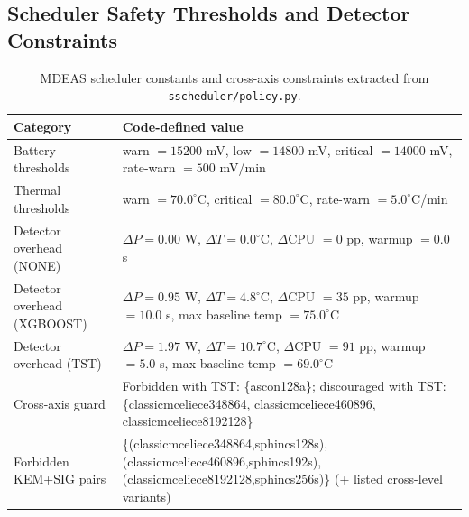 \subsection{Scheduler Safety Thresholds and Detector Constraints}
\begin{table}[t]
\centering
\caption{MDEAS scheduler constants and cross-axis constraints extracted from \texttt{sscheduler/policy.py}.}
\footnotesize
\setlength{\tabcolsep}{4pt}
\begin{tabular}{@{}ll@{}}\toprule
Category & Code-defined value \\ \midrule
Battery thresholds & warn $=15200$ mV, low $=14800$ mV, critical $=14000$ mV, rate-warn $=500$ mV/min \\
Thermal thresholds & warn $=70.0^{\circ}$C, critical $=80.0^{\circ}$C, rate-warn $=5.0^{\circ}$C/min \\
Detector overhead (NONE) & $\Delta P=0.00$ W, $\Delta T=0.0^{\circ}$C, $\Delta$CPU $=0$ pp, warmup $=0.0$ s \\
Detector overhead (XGBOOST) & $\Delta P=0.95$ W, $\Delta T=4.8^{\circ}$C, $\Delta$CPU $=35$ pp, warmup $=10.0$ s, max baseline temp $=75.0^{\circ}$C \\
Detector overhead (TST) & $\Delta P=1.97$ W, $\Delta T=10.7^{\circ}$C, $\Delta$CPU $=91$ pp, warmup $=5.0$ s, max baseline temp $=69.0^{\circ}$C \\
Cross-axis guard & Forbidden with TST: \{ascon128a\}; discouraged with TST: \{classicmceliece348864, classicmceliece460896, classicmceliece8192128\} \\
Forbidden KEM+SIG pairs & \{(classicmceliece348864,sphincs128s), (classicmceliece460896,sphincs192s), (classicmceliece8192128,sphincs256s)\} (+ listed cross-level variants) \\
\bottomrule\end{tabular}
\label{tab:scheduler-thresholds-constraints}
\end{table}

\clearpage
